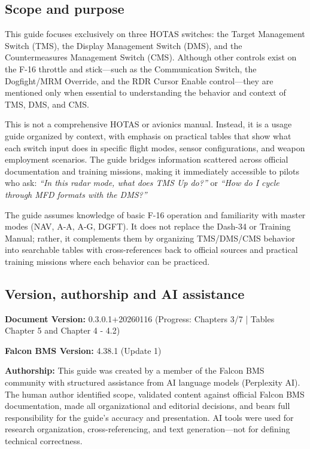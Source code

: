 \documentclass[11pt,a4paper]{article}
\newcommand{\docversion}{0.3.0.1} %
\newcommand{\docbuild}{20260116}
\newcommand{\chapterscompletedof}{3/7}
\newcommand{\tablesfilledpct}{Chapter 5 and Chapter 4 - 4.2}
\newcommand{\fulldocversion}{\docversion+\docbuild} %
\begin{document}
\subsection{Scope and purpose}

This guide focuses exclusively on three HOTAS switches: the Target Management Switch (TMS), the Display Management Switch (DMS), and the Countermeasures Management Switch (CMS). Although other controls exist on the F-16 throttle and stick---such as the Communication Switch, the Dogfight/MRM Override, and the RDR Cursor Enable control---they are mentioned only when essential to understanding the behavior and context of TMS, DMS, and CMS.

This is not a comprehensive HOTAS or avionics manual. Instead, it is a usage guide organized by context, with emphasis on practical tables that show what each switch input does in specific flight modes, sensor configurations, and weapon employment scenarios. The guide bridges information scattered across official documentation and training missions, making it immediately accessible to pilots who ask: \emph{``In this radar mode, what does TMS Up do?''} or \emph{``How do I cycle through MFD formats with the DMS?''}

The guide assumes knowledge of basic F-16 operation and familiarity with master modes (NAV, A-A, A-G, DGFT). It does not replace the Dash-34 or Training Manual; rather, it complements them by organizing TMS/DMS/CMS behavior into searchable tables with cross-references back to official sources and practical training missions where each behavior can be practiced.

\subsection{Version, authorship and AI assistance}

\textbf{Document Version:} \fulldocversion{} (Progress: Chapters \chapterscompletedof{} | Tables \tablesfilledpct)

\textbf{Falcon BMS Version:} 4.38.1 (Update 1)

\textbf{Authorship:} This guide was created by a member of the Falcon BMS community with structured assistance from AI language models (Perplexity AI). The human author identified scope, validated content against official Falcon BMS documentation, made all organizational and editorial decisions, and bears full responsibility for the guide's accuracy and presentation. AI tools were used for research organization, cross-referencing, and text generation---not for defining technical correctness.
\end{document}
